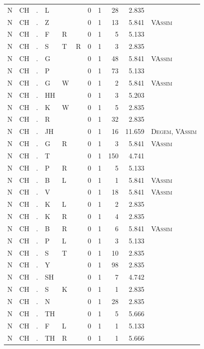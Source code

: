 \documentclass[12pt]{article}
\begin{document}
\begin{longtable}{r@{ } r@{ } c@{ } l@{ } l@{ } l@{ } r r r r l }
N & CH & . & L &  &  & 0 & 1 & 28 & 2.835 &  \\
N & CH & . & Z &  &  & 0 & 1 & 13 & 5.841 & \textsc{VAssim} \\
N & CH & . & F & R &  & 0 & 1 & 5 & 5.133 &  \\
N & CH & . & S & T & R & 0 & 1 & 3 & 2.835 &  \\
N & CH & . & G &  &  & 0 & 1 & 48 & 5.841 & \textsc{VAssim} \\
N & CH & . & P &  &  & 0 & 1 & 73 & 5.133 &  \\
N & CH & . & G & W &  & 0 & 1 & 2 & 5.841 & \textsc{VAssim} \\
N & CH & . & HH &  &  & 0 & 1 & 3 & 5.203 &  \\
N & CH & . & K & W &  & 0 & 1 & 5 & 2.835 &  \\
N & CH & . & R &  &  & 0 & 1 & 32 & 2.835 &  \\
N & CH & . & JH &  &  & 0 & 1 & 16 & 11.659 & \textsc{Degem}, \textsc{VAssim} \\
N & CH & . & G & R &  & 0 & 1 & 3 & 5.841 & \textsc{VAssim} \\
N & CH & . & T &  &  & 0 & 1 & 150 & 4.741 &  \\
N & CH & . & P & R &  & 0 & 1 & 5 & 5.133 &  \\
N & CH & . & B & L &  & 0 & 1 & 1 & 5.841 & \textsc{VAssim} \\
N & CH & . & V &  &  & 0 & 1 & 18 & 5.841 & \textsc{VAssim} \\
N & CH & . & K & L &  & 0 & 1 & 2 & 2.835 &  \\
N & CH & . & K & R &  & 0 & 1 & 4 & 2.835 &  \\
N & CH & . & B & R &  & 0 & 1 & 6 & 5.841 & \textsc{VAssim} \\
N & CH & . & P & L &  & 0 & 1 & 3 & 5.133 &  \\
N & CH & . & S & T &  & 0 & 1 & 10 & 2.835 &  \\
N & CH & . & Y &  &  & 0 & 1 & 98 & 2.835 &  \\
N & CH & . & SH &  &  & 0 & 1 & 7 & 4.742 &  \\
N & CH & . & S & K &  & 0 & 1 & 1 & 2.835 &  \\
N & CH & . & N &  &  & 0 & 1 & 28 & 2.835 &  \\
N & CH & . & TH &  &  & 0 & 1 & 5 & 5.666 &  \\
N & CH & . & F & L &  & 0 & 1 & 1 & 5.133 &  \\
N & CH & . & TH & R &  & 0 & 1 & 1 & 5.666 &  \\

\end{longtable}
\end{document}
